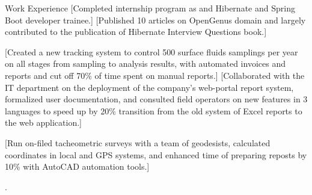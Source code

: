 \begin{resumesection}{Work Experience}
			[Completed internship program as and Hibernate and Spring Boot developer trainee.]
			[Published 10 articles on OpenGenus domain and largely contributed to the publication of Hibernate Interview Questions book.]

			[Created a new tracking system to control 500 surface fluids samplings per year on all stages from sampling to analysis results, with automated invoices and reports and cut off 70\% of time spent on manual reports.]
			[Collaborated with the IT department on the deployment of the company's web-portal report system, formalized user documentation, and consulted field operators on new features in 3 languages to speed up by 20\% transition from the old system of Excel reports to the web application.]


			[Run on-filed tacheometric surveys with a team of geodesists, calculated coordinates in local and GPS systems, and enhanced time of preparing reposts by 10\% with AutoCAD automation tools.]
\end{resumesection}
.  
